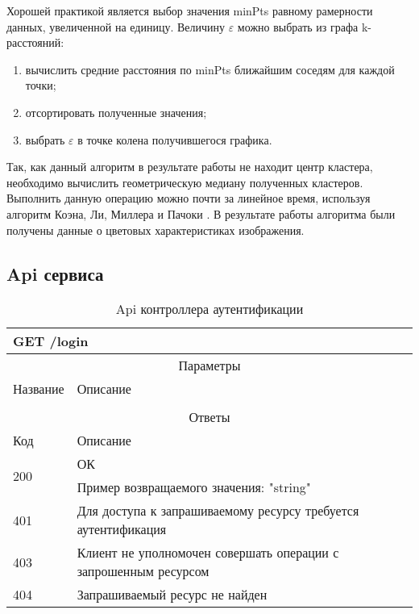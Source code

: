 Хорошей практикой является выбор значения minPts равному рамерности данных, увеличенной на единицу.
Величину \(\mathcal{\varepsilon}\) можно выбрать из графа k-расстояний\cite{k-graph}:
\begin{enumerate}
    \item вычислить средние расстояния по minPts ближайшим соседям для каждой точки;
    \item отсортировать полученные значения;
    \item выбрать \(\mathcal{\varepsilon}\) в точке колена получившегося графика.
\end{enumerate}

Так, как данный алгоритм в результате работы не находит центр кластера, необходимо вычислить геометрическую медиану полученных кластеров.
Выполнить данную операцию можно почти за линейное время, используя алгоритм Коэна, Ли, Миллера и Пачоки \cite{median-linear}.
В результате работы алгоритма были получены данные о цветовых характеристиках изображения.

\subsection{Api сервиса}

\begin{table}[H]
  \caption{Api контроллера аутентификации}\label{api-auth-table}
  \begin{tabular}{|p{6cm}|p{10cm}|}
  \hline \multicolumn{2}{|l|}{GET /login} \\
  \hline \multicolumn{2}{|c|}{Параметры} \\
  \hline Название & Описание \\
  \hline  &  \\
  \hline \multicolumn{2}{|c|}{Ответы} \\
  \hline Код & Описание \\
  \hline \multirow{2}{=}{200} & ОК \\
   & Пример возвращаемого значения: "string"\\
  \hline 401 & Для доступа к запрашиваемому ресурсу требуется аутентификация \\
  \hline 403 & Клиент не уполномочен совершать операции с запрошенным ресурсом \\
  \hline 404 & Запрашиваемый ресурс не найден \\
  \hline
  \end{tabular}
\end{table}

